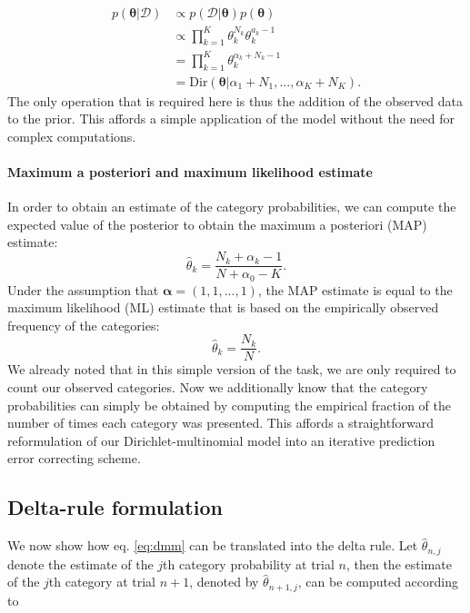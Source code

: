 \documentclass[a4paper,12pt]{article}
\begin{document}
\begin{equation}
\begin{aligned}
p(\boldsymbol{\theta}|\boldsymbol{\mathcal{D}})
&\propto p(\boldsymbol{\mathcal{D}}|\boldsymbol{\theta})p(\boldsymbol{\theta})\\
&\propto \prod^K_{k=1} \theta^{N_k}_k \theta_k^{a_{k}-1} \\
&= \prod^K_{k=1} \theta^{\alpha_k+N_{k}-1}_k \\ 
&= \mathrm{Dir}(\boldsymbol{\theta}|\alpha_1 + N_1,...,\alpha_K + N_K).
\end{aligned}
\end{equation}
The only operation that is required here is thus the addition of the observed data to the prior. This affords a simple application of the model without the need for complex computations.

\paragraph{Maximum a posteriori and maximum likelihood estimate}
In order to obtain an estimate of the category probabilities, we can compute the expected value of the posterior to obtain the maximum a posteriori (MAP) estimate:
\begin{equation}
\hat{\theta}_k = \dfrac{N_k+\alpha_k-1}{N+\alpha_0-K}.
\end{equation}
Under the assumption that $\boldsymbol{\alpha} = (1,1,...,1)$, the MAP estimate is equal to the maximum likelihood (ML) estimate that is based on the empirically observed frequency of the categories:
\begin{equation}
\hat{\theta}_k = \dfrac{N_k}{N}.
\label{eq:dmm}
\end{equation}
We already noted that in this simple version of the task, we are only required to count our observed categories. Now we additionally know that the category probabilities can simply be obtained by computing the empirical fraction of the number of times each category was presented. This affords a straightforward reformulation of our Dirichlet-multinomial model into an iterative prediction error correcting scheme.


\subsection{Delta-rule formulation}\label{delta}

We now show how eq. \ref{eq:dmm} can be translated into the delta rule. Let $\hat{\theta}_{n,j}$ denote the estimate of the $j$th category probability at trial $n$, then the estimate of the $j$th category at trial $n+1$, denoted by $\hat{\theta}_{n+1,j}$, can be computed according to 
\end{document}
